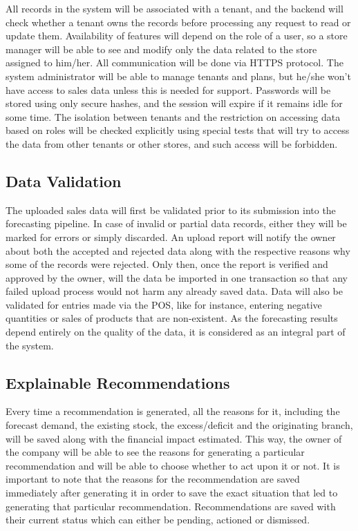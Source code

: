 \documentclass{StockSense}
\begin{document}
All records in the system will be associated with a tenant, and the backend will check whether a tenant owns the records before processing any request to read or update them. Availability of features will depend on the role of a user, so a store manager will be able to see and modify only the data related to the store assigned to him/her. All communication will be done via HTTPS protocol. The system administrator will be able to manage tenants and plans, but he/she won’t have access to sales data unless this is needed for support. Passwords will be stored using only secure hashes, and the session will expire if it remains idle for some time. The isolation between tenants and the restriction on accessing data based on roles will be checked explicitly using special tests that will try to access the data from other tenants or other stores, and such access will be forbidden.

\subsection{Data Validation}

The uploaded sales data will first be validated prior to its submission into the forecasting pipeline. In case of invalid or partial data records, either they will be marked for errors or simply discarded. An upload report will notify the owner about both the accepted and rejected data along with the respective reasons why some of the records were rejected. Only then, once the report is verified and approved by the owner, will the data be imported in one transaction so that any failed upload process would not harm any already saved data. Data will also be validated for entries made via the POS, like for instance, entering negative quantities or sales of products that are non-existent. As the forecasting results depend entirely on the quality of the data, it is considered as an integral part of the system.

\subsection{Explainable Recommendations}

Every time a recommendation is generated, all the reasons for it, including the forecast demand, the existing stock, the excess/deficit and the originating branch, will be saved along with the financial impact estimated. This way, the owner of the company will be able to see the reasons for generating a particular recommendation and will be able to choose whether to act upon it or not. It is important to note that the reasons for the recommendation are saved immediately after generating it in order to save the exact situation that led to generating that particular recommendation. Recommendations are saved with their current status which can either be pending, actioned or dismissed.
\end{document}
